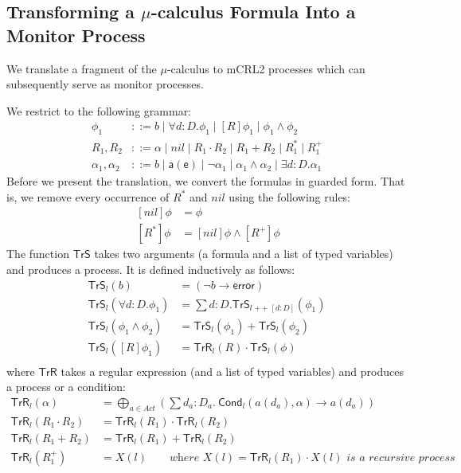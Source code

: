 \documentclass[letter]{llncs}
\newcommand{\Tr}{\ensuremath{\mathsf{TrS}}}
\newcommand{\TrR}{\ensuremath{\mathsf{TrR}}}
\newcommand{\TrA}{\ensuremath{\mathsf{Cond}}}
\renewcommand{\a}[1]{\ensuremath{\mathsf{#1}}}
\newcommand{\concat}{\ensuremath{\mathop{+\!\!+}}}
\begin{document}
\subsection{Transforming a $\mu$-calculus Formula Into a Monitor Process} 
We translate a fragment of the $\mu$-calculus to mCRL2 processes which
can subsequently serve as monitor processes.

We restrict to the following grammar:
\[
\begin{array}{ll}
\phi_1 & ::= b \mid \forall d:D.\phi_1 \mid [R]\phi_1 \mid \phi_1\wedge \phi_2\\
R_1,R_2 & ::= \alpha \mid nil \mid R_1\cdot R_2 \mid
              R_1+R_2 \mid
              R_1^* \mid R_1^+ \\
\alpha_1,\alpha_2 & ::= b \mid \a{a(e)} \mid \neg \alpha_1 \mid
              \alpha_1 \wedge \alpha_2 \mid
              \exists d:D.\alpha_1
\end{array}
\]
Before we present the translation, we convert the formulas in
guarded form. That is, we remove every occurrence of $R^*$ and $nil$ using
the following rules:
\[
\begin{array}{ll}
~
[nil]\phi &= \phi \\
~[R^*]\phi &= [nil]\phi \wedge [R^+]\phi
\end{array}
\]
The function $\Tr$ takes two arguments (a formula and a list of typed
variables) and produces a process. It is defined inductively as follows:
\[
\begin{array}{ll}
\Tr_l(b) &= (\neg b \to \a{error}) \\
\Tr_l(\forall d:D.\phi_1) & = \sum d:D. \Tr_{l\concat [d:D]} (\phi_1) \\
\Tr_l(\phi_1 \wedge \phi_2) & = \Tr_l(\phi_1) + \Tr_l(\phi_2) \\
\Tr_l([R]\phi_1) & = \TrR_l(R) \cdot \Tr_l(\phi) \\
\end{array}
\]
where $\TrR$ takes a regular expression (and a list of typed variables)
and produces a process or a condition:
\[
\begin{array}{ll}
\TrR_l(\alpha) &= \bigoplus\limits_{a \in Act} (\sum d_a:D_a.~ \TrA_l(a(d_a),\alpha) \to a(d_a)) \\
\TrR_l(R_1 \cdot R_2) & = \TrR_l(R_1) \cdot \TrR_l(R_2) \\
\TrR_l(R_1 + R_2) &= \TrR_l(R_1) + \TrR_l(R_2) \\
\TrR_l(R_1^+) & = X(l) \qquad \textit{where $X(l) = \TrR_l(R_1)\cdot X(l)$ is
a recursive process} 
\end{array}
\]
\end{document}
